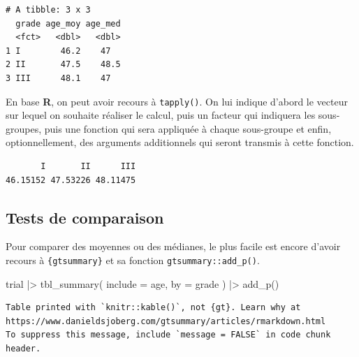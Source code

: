 \documentclass[
  letterpaper,
  DIV=11,
  numbers=noendperiod,
  oneside]{scrreprt}
\newenvironment{Shaded}{\begin{snugshade}}{\end{snugshade}}
\newcommand{\AttributeTok}[1]{\textcolor[rgb]{0.40,0.45,0.13}{#1}}
\newcommand{\ConstantTok}[1]{\textcolor[rgb]{0.56,0.35,0.01}{#1}}
\newcommand{\FunctionTok}[1]{\textcolor[rgb]{0.28,0.35,0.67}{#1}}
\newcommand{\NormalTok}[1]{\textcolor[rgb]{0.00,0.23,0.31}{#1}}
\newcommand{\SpecialCharTok}[1]{\textcolor[rgb]{0.37,0.37,0.37}{#1}}
\begin{document}
\begin{verbatim}
# A tibble: 3 x 3
  grade age_moy age_med
  <fct>   <dbl>   <dbl>
1 I        46.2    47  
2 II       47.5    48.5
3 III      48.1    47  
\end{verbatim}

En base \textbf{R}, on peut avoir recours à \texttt{tapply()}. On lui
indique d'abord le vecteur sur lequel on souhaite réaliser le calcul,
puis un facteur qui indiquera les sous-groupes, puis une fonction qui
sera appliquée à chaque sous-groupe et enfin, optionnellement, des
arguments additionnels qui seront transmis à cette fonction.

\begin{Shaded}
\end{Shaded}

\begin{verbatim}
       I       II      III 
46.15152 47.53226 48.11475 
\end{verbatim}

\hypertarget{tests-de-comparaison}{%
\subsection{Tests de comparaison}\label{tests-de-comparaison}}

Pour comparer des moyennes ou des médianes, le plus facile est encore
d'avoir recours à \texttt{\{gtsummary\}} et sa fonction
\texttt{gtsummary::add\_p()}.

\begin{Shaded}
\begin{Highlighting}[]
\NormalTok{trial }\SpecialCharTok{|\textgreater{}} 
  \FunctionTok{tbl\_summary}\NormalTok{(}
    \AttributeTok{include =}\NormalTok{ age,}
    \AttributeTok{by =}\NormalTok{ grade}
\NormalTok{  ) }\SpecialCharTok{|\textgreater{}} 
  \FunctionTok{add\_p}\NormalTok{()}
\end{Highlighting}
\end{Shaded}

\begin{verbatim}
Table printed with `knitr::kable()`, not {gt}. Learn why at
https://www.danieldsjoberg.com/gtsummary/articles/rmarkdown.html
To suppress this message, include `message = FALSE` in code chunk header.
\end{verbatim}
\end{document}
